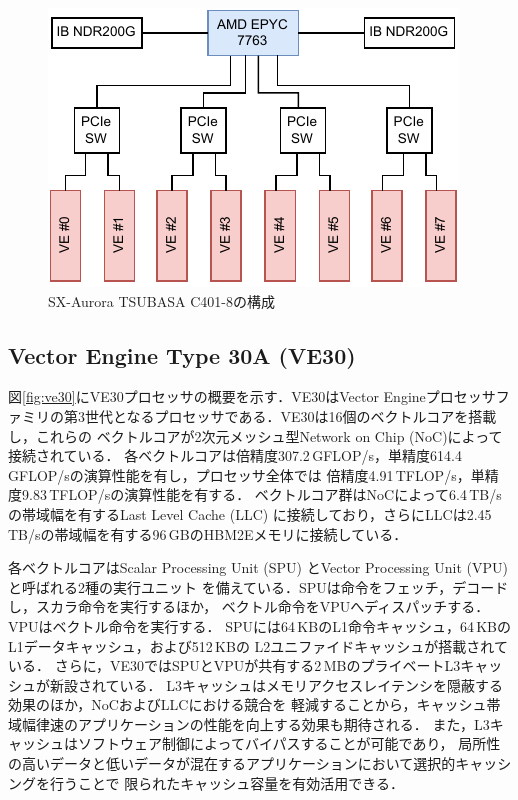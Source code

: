 ﻿\documentclass[submit,techrep,noauthor]{ipsj}
\begin{document}
\begin{figure}[tb]
  \centering
  \includegraphics{figs/node_arch.pdf}
  \caption{SX-Aurora TSUBASA C401-8の構成}\label{fig:node}
\end{figure}

\subsection{Vector Engine Type 30A (VE30)}


図\ref{fig:ve30}にVE30プロセッサの概要を示す．VE30はVector
Engineプロセッサファミリの第3世代となるプロセッサである．VE30は16個のベクトルコアを搭載し，これらの
ベクトルコアが2次元メッシュ型Network on Chip (NoC)によって接続されている．
各ベクトルコアは倍精度307.2\,GFLOP/s，単精度614.4\,GFLOP/sの演算性能を有し，プロセッサ全体では
倍精度4.91\,TFLOP/s，単精度9.83\,TFLOP/sの演算性能を有する．
ベクトルコア群はNoCによって6.4\,TB/sの帯域幅を有するLast Level Cache 
(LLC) に接続しており，さらにLLCは2.45\,TB/sの帯域幅を有する96\,GBのHBM2Eメモリに接続している．

各ベクトルコアはScalar Processing Unit (SPU) とVector Processing Unit (VPU) と呼ばれる2種の実行ユニット
を備えている．SPUは命令をフェッチ，デコードし，スカラ命令を実行するほか，
ベクトル命令をVPUへディスパッチする．VPUはベクトル命令を実行する．
SPUには64\,KBのL1命令キャッシュ，64\,KBのL1データキャッシュ，および512\,KBの
L2ユニファイドキャッシュが搭載されている．
さらに，VE30ではSPUとVPUが共有する2\,MBのプライベートL3キャッシュが新設されている．
L3キャッシュはメモリアクセスレイテンシを隠蔽する効果のほか，NoCおよびLLCにおける競合を
軽減することから，キャッシュ帯域幅律速のアプリケーションの性能を向上する効果も期待される．
また，L3キャッシュはソフトウェア制御によってバイパスすることが可能であり，
局所性の高いデータと低いデータが混在するアプリケーションにおいて選択的キャッシングを行うことで
限られたキャッシュ容量を有効活用できる．
\end{document}
